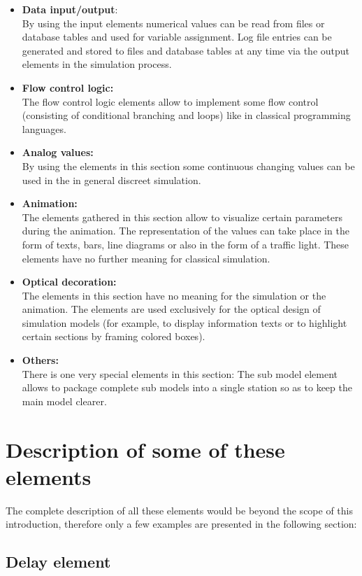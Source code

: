 \documentclass{svmono}
\begin{document}
\begin{itemize}
\item
\textbf{Data input/output}:\\
By using the input elements numerical values can be read from files or database tables and used for variable assignment.
Log file entries can be generated and stored to files and database tables at any time via the output elements in the simulation process.
\item
\textbf{Flow control logic:}\\
The flow control logic elements allow to implement some flow control (consisting of conditional branching and loops)
like in classical programming languages.
\item
\textbf{Analog values:}\\
By using the elements in this section some continuous changing values can be used in the in general discreet simulation.
\item
\textbf{Animation:}\\
The elements gathered in this section allow to visualize certain parameters during the animation. The representation of the values can take place in the form of texts, bars, line diagrams or also in the form of a traffic light. These elements have no further meaning for classical simulation.
\item
\textbf{Optical decoration:}\\
The elements in this section have no meaning for the simulation or the animation. The elements are used exclusively for the optical design of simulation models (for example, to display information texts or to highlight certain sections by framing colored boxes).
\item
\textbf{Others:}\\
There is one very special elements in this section: The sub model element allows to package complete sub models into a single station so as to keep the main model clearer.
\end{itemize}

\section{Description of some of these elements}

The complete description of all these elements would be beyond the scope of this introduction, therefore only a few examples are presented in the following section:

\subsection*{Delay element}
\end{document}
